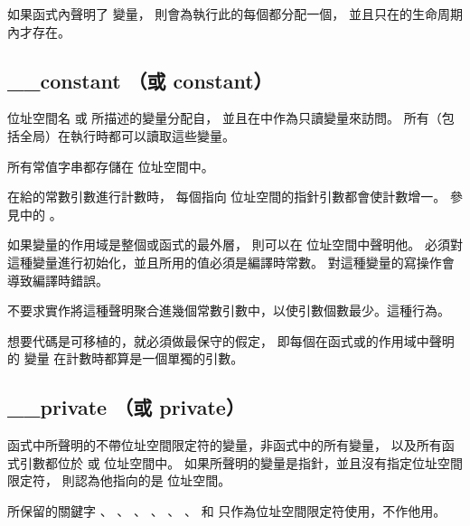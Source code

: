 \startnotepar
如果函式內聲明了  變量，
則會為執行此的每個都分配一個，
並且只在的生命周期內才存在。
\stopnotepar

\subsection{__constant （或 constant）}

位址空間名  或  所描述的變量分配自，
並且在中作為只讀變量來訪問。
所有（包括全局）在執行時都可以讀取這些變量。

所有常值字串都存儲在  位址空間中。

\startnotepar
在給的常數引數進行計數時，
每個指向  位址空間的指針引數都會使計數增一。
參見中的 。
\stopnotepar

如果變量的作用域是整個或函式的最外層，
則可以在  位址空間中聲明他。
必須對這種變量進行初始化，並且所用的值必須是編譯時常數。
對這種變量的寫操作會導致編譯時錯誤。

不要求實作將這種聲明聚合進幾個常數引數中，以使引數個數最少。這種行為。

想要代碼是可移植的，就必須做最保守的假定，
即每個在函式或的作用域中聲明的  變量
在計數時都算是一個單獨的引數。

\subsection{__private （或 private）}

函式中所聲明的不帶位址空間限定符的變量，非函式中的所有變量，
以及所有函式引數都位於  或  位址空間中。
如果所聲明的變量是指針，並且沒有指定位址空間限定符，
則認為他指向的是  位址空間。

所保留的關鍵字
 、 、 、 、
 、 、  和 
 只作為位址空間限定符使用，不作他用。
